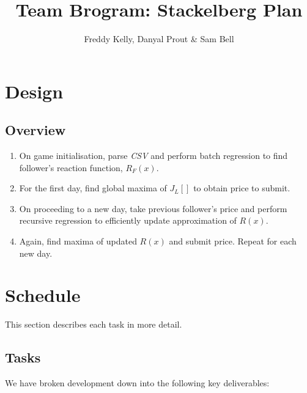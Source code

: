 \documentclass[10pt,a4paper]{report}
\title{Team Brogram: Stackelberg Plan}
\author{Freddy Kelly, Danyal Prout \& Sam Bell}
\begin{document}
\maketitle

\section{Design}

\subsection{Overview}
\begin{enumerate}
  \item On game initialisation, parse \emph{CSV} and perform batch regression to find follower's reaction function, $R_F(x)$.
  \item For the first day, find global maxima of $J_L[]$ to obtain price to submit.
  \item On proceeding to a new day, take previous follower's price and perform recursive regression to efficiently update approximation of $R(x)$.
  \item Again, find maxima of updated $R(x)$ and submit price. Repeat for each new day.
\end{enumerate}

\section{Schedule}
This section describes each task in more detail.

\subsection{Tasks}
We have broken development down into the following key deliverables:
\end{document}
